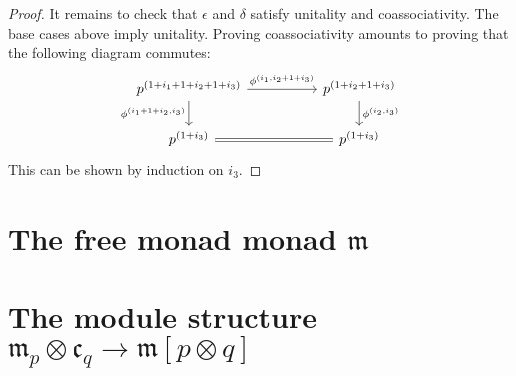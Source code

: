 \documentclass[11pt, one side, article]{memoir}
\theoremstyle{definition}
\theoremstyle{plain}
\newcommand{\free}{\mathfrak{m}}
\newcommand{\cofree}{\mathfrak{c}}
\newcommand{\coh}[1]{^{(#1)}}
\begin{document}
\begin{proof}
It remains to check that $\epsilon$ and $\delta$ satisfy unitality and coassociativity. The base cases above imply unitality. Proving coassociativity amounts to proving that the following diagram commutes:
\[
\begin{tikzcd}[column sep=50pt]
	p\coh{1+i_1+1+i_2+1+i_3}\ar[r, "\phi\coh{i_1,i_2+1+i_3}"]\ar[d, "\phi\coh{i_1+1+i_2,i_3}"']&
	p\coh{1+i_2+1+i_3}\ar[d, "\phi\coh{i_2,i_3}"]\\
	p\coh{1+i_3}\ar[r,equal]&p\coh{1+i_3}
\end{tikzcd}
\]
This can be shown by induction on $i_3$.
\end{proof}

\chapter{The free monad monad $\free$}

\chapter{The module structure $\free_p\otimes\cofree_q\to\free[p\otimes q]$}


\printbibliography
\end{document}
